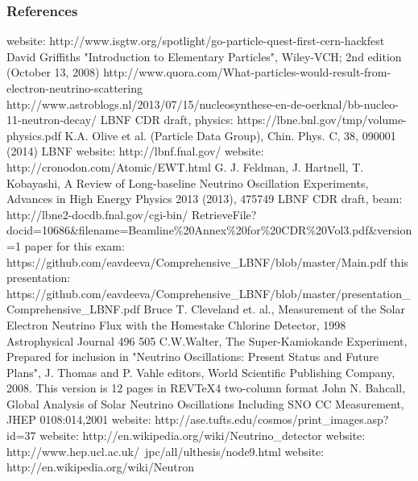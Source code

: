 \begin{frame}[allowframebreaks]\frametitle{References}
\tiny
\begin{thebibliography}{1}
    website: http://www.isgtw.org/spotlight/go-particle-quest-first-cern-hackfest
    David Griffiths "Introduction to Elementary Particles", Wiley-VCH; 2nd edition (October 13, 2008)
   http://www.quora.com/What-particles-would-result-from-electron-neutrino-scattering
    http://www.astroblogs.nl/2013/07/15/nucleosynthese-en-de-oerknal/bb-nucleo-11-neutron-decay/
    LBNF CDR draft, physics: https://lbne.bnl.gov/tmp/volume-physics.pdf
    K.A. Olive et al. (Particle Data Group), Chin. Phys. C, 38, 090001 (2014) 
    LBNF website: http://lbnf.fnal.gov/
    website: http://cronodon.com/Atomic/EWT.html
    G. J. Feldman, J. Hartnell, T. Kobayashi, A Review of Long-baseline Neutrino Oscillation Experiments, Advances in High Energy Physics 2013 (2013), 475749
    LBNF CDR draft, beam: http://lbne2-docdb.fnal.gov/cgi-bin/ RetrieveFile?docid=10686\&filename=Beamline\%20Annex\%20for\%20CDR\%20Vol3.pdf\&version=1
    paper for this exam: https://github.com/eavdeeva/Comprehensive\_LBNF/blob/master/Main.pdf
    this presentation: https://github.com/eavdeeva/Comprehensive\_LBNF/blob/master/presentation\_Comprehensive\_LBNF.pdf
    Bruce T. Cleveland et. al., Measurement of the Solar Electron Neutrino Flux with the Homestake Chlorine Detector, 1998 Astrophysical Journal 496 505
    C.W.Walter, The Super-Kamiokande Experiment, Prepared for inclusion in "Neutrino Oscillations: Present Status and Future Plans", J. Thomas and P. Vahle editors, World Scientific Publishing Company, 2008. This version is 12 pages in REVTeX4 two-column format
    John N. Bahcall, Global Analysis of Solar Neutrino Oscillations Including SNO CC Measurement, JHEP 0108:014,2001
    website: http://ase.tufts.edu/cosmos/print\_images.asp?id=37
    website: http://en.wikipedia.org/wiki/Neutrino\_detector
    website: http://www.hep.ucl.ac.uk/~jpc/all/ulthesis/node9.html
    website: http://en.wikipedia.org/wiki/Neutron

\end{thebibliography}
\end{frame}
